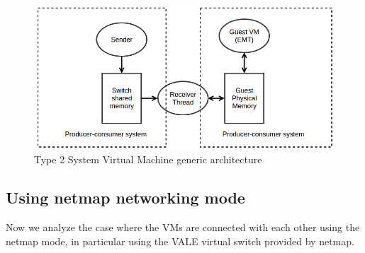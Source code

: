 \documentclass[a4paper, 12pt, titlepage]{report}
\begin{document}
\begin{figure}[!t]
	\centering
	\includegraphics[scale=0.5]{img/prod-cons.png}
	\caption{Type 2 System Virtual Machine generic architecture}
	\label{img:prod_cons}
\end{figure}
\subsection{Using netmap networking mode} \label{subsec:using_netmap_mode}
Now we analyze the case where the VMs are connected with each other using the netmap mode, in particular using the VALE virtual switch provided by netmap. 
\end{document}
